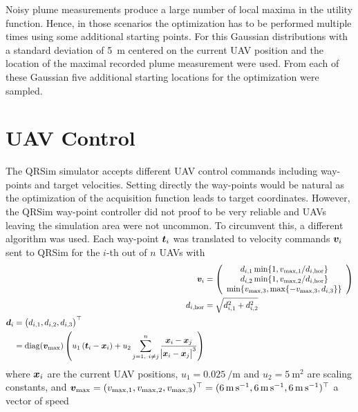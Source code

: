 Noisy plume measurements produce a large number of local maxima in the utility 
function. Hence, in those scenarios the optimization has to be performed 
multiple times using some additional starting points. For this Gaussian 
distributions with a standard deviation of \SI{5}{\meter} centered on the 
current UAV position and the location of the maximal recorded plume measurement 
were used.  From each of these Gaussian five additional starting locations for 
the optimization were sampled.

\section{UAV Control}
The QRSim simulator accepts different UAV control commands including way-points 
and target velocities. Setting directly the way-points would be natural as the 
optimization of the acquisition function leads to target coordinates. However, 
the QRSim way-point controller did not proof to be very reliable and UAVs 
leaving the simulation area were not uncommon. To circumvent this, a different 
algorithm was used. Each way-point $\bm{t}_i$ was translated to velocity commands 
$\bm{v}_i$ sent to QRSim for the $i$-th out of $n$ UAVs with
\begin{align}
        \vc v_i &= \del{\begin{array}{c}
            d_{i, 1} \min\{1, v_{\max,1} / d_{i,\mathrm{hor}}\} \\
            d_{i, 2} \min\{1, v_{\max,2} / d_{i,\mathrm{hor}}\} \\
            \min\{v_{\max,3}, \max\{-v_{\max,3}, d_{i, 3}\}\}
        \end{array}} \label{eqn:final_velocities} \\
        d_{i,\mathrm{hor}} &= \sqrt{d_{i, 1}^2 + d_{i, 2}^2} \\
    \begin{split}
        \vc d_i &= \del{d_{i,1}, d_{i,2}, d_{i,3}}\Tr \\
        &= \diag\!\del{\vc v\ped{\max}} \del{u_1 \del{\vc t_i - \vc x_i} + u_2 
            \sum_{j = 1,\ i \neq j}^{n} \frac{\vc x_i - \vc x_j}{\abs{\vc x_i 
                    - \vc x_j}^3}}
    \end{split}
\end{align}
where $\bm{x}_i$ are the current UAV positions, $u_1 = \SI{0.025}{\per\meter}$ 
and $u_2 = \SI{5}{\meter\squared}$ are scaling constants, and $\bm{v}_{\max} 
= (v_{\max,1}, v_{\max,2}, v_{\max,3})^{\top} = (\SI{6}{\meter\per\second}, 
\SI{6}{\meter\per\second}, \SI{6}{\meter\per\second})^{\top}$ a vector of speed 
